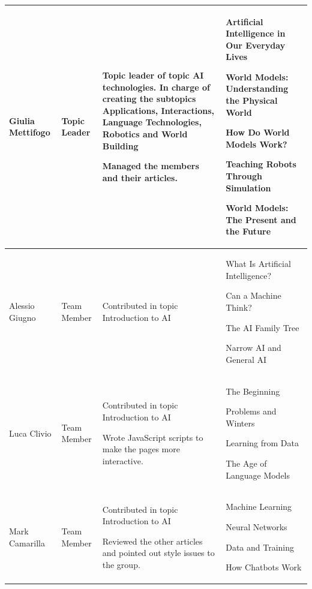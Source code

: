 \documentclass[11pt]{article}
\begin{document}
\begin{longtable} [c] {|p{3cm}|l|p{7cm}|p{4cm}|}
	Giulia Mettifogo & Topic Leader & 
	\par \textbullet{} Topic leader of topic AI technologies. In charge of creating the subtopics Applications, Interactions, Language Technologies, Robotics and World Building
	\par \textbullet{} Managed the members and their articles. &
	\par \textbullet{} Artificial Intelligence in Our Everyday Lives
	\par \textbullet{} World Models: Understanding the Physical World
	\par \textbullet{} How Do World Models Work?
	\par \textbullet{} Teaching Robots Through Simulation 
	\par \textbullet{} World Models: The Present and the Future \\ 
	\hline
	
	Alessio Giugno & Team Member &
	\par \textbullet{} Contributed in topic Introduction to AI &
	\par \textbullet{} What Is Artificial Intelligence?
	\par \textbullet{} Can a Machine Think?
	\par \textbullet{} The AI Family Tree
	\par \textbullet{} Narrow AI and General AI\\ 
	\hline
	
	Luca Clivio & Team Member &
	\par \textbullet{} Contributed in topic Introduction to AI
	\par \textbullet{} Wrote JavaScript scripts to make the pages more interactive. &
	\par \textbullet{} The Beginning
	\par \textbullet{} Problems and Winters
	\par \textbullet{} Learning from Data
	\par \textbullet{} The Age of Language Models \\ 
	\hline
	
	Mark Camarilla & Team Member &
	\par \textbullet{} Contributed in topic Introduction to AI
	\par \textbullet{} Reviewed the other articles and pointed out style issues to the group. &
	\par \textbullet{} Machine Learning
	\par \textbullet{} Neural Networks
	\par \textbullet{} Data and Training
	\par \textbullet{} How Chatbots Work \\ 
	\hline
	

\end{longtable}
\end{document}
